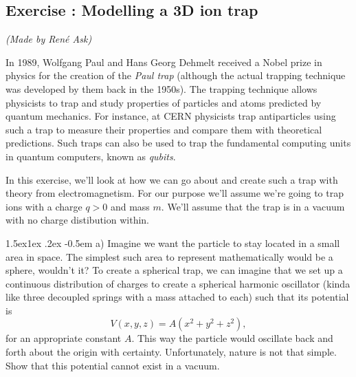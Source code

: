 \documentclass[%
oneside,                 %
final,                   %
10pt]{article}
\makeatletter
\newenvironment{doconceexercise}{}{}
\newcounter{doconceexercisecounter}
\newcommand\subex{\@startsection{paragraph}{4}{\z@}%
                  {1.5ex\@plus1ex \@minus.2ex}%
                  {-0.5em}%
                  {\normalfont\normalsize\bfseries}}
\makeatother
\begin{document}

\newcommand{\exercisesection}[1]{\subsection*{#1}}





\begin{doconceexercise}

\exercisesection{Exercise \thedoconceexercisecounter: Modelling a 3D ion trap}


\emph{(Made by René Ask)}


In 1989, Wolfgang Paul and Hans Georg Dehmelt received a Nobel prize in physics for the creation of the \emph{Paul trap} (although the actual trapping technique was developed by them back in the 1950s). The trapping technique allows physicists to trap and study properties of particles and atoms predicted by quantum mechanics.
For instance, at CERN physicists trap antiparticles using such a trap to measure their properties and compare them with theoretical predictions. Such traps can also be used to trap the fundamental computing units in quantum computers, known as \emph{qubits}.

In this exercise, we'll look at how we can go about and create such a trap with theory from electromagnetism. For our purpose we'll assume we're going to trap ions with a charge $q > 0$ and mass $m$. We'll assume that the trap is in a vacuum with no charge distibution within.


\subex{a)}
Imagine we want the particle to stay located in a small area in space. The simplest such area to represent mathematically would be a sphere, wouldn't it? To create a spherical trap, we can imagine that we set up a continuous distribution of charges to create a spherical harmonic oscillator (kinda like three decoupled springs with a mass attached to each) such that its potential is
\begin{equation}
  V(x,y,z) = A(x^2 + y^2 + z^2),
\end{equation}
for an appropriate constant $A$. This way the particle would oscillate back and forth about the origin with certainty. Unfortunately, nature is not that simple. Show that this potential cannot exist in a vacuum.



\end{doconceexercise}
\end{document}
